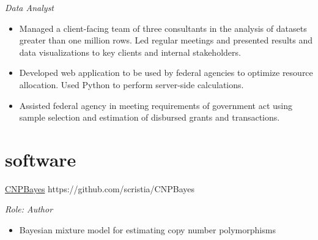\documentclass[]{friggeri-cv} %
\begin{document}
\begin{entrylist}
{\emph{Data Analyst}
\begin{itemize}
\renewcommand\labelitemi{--}
\item Managed a client-facing team of three consultants in the analysis of datasets greater than one million rows. 
Led regular meetings and presented results and data visualizations to key clients and internal stakeholders.
\item Developed web application to be used by federal agencies to optimize resource allocation. 
Used Python to perform server-side calculations.
\item Assisted federal agency in meeting requirements of government act using sample selection and estimation of disbursed grants and transactions.
\end{itemize}
}
\end{entrylist}


\section{software}
\begin{entrylist}
\entry
{}
{\href{https://github.com/scristia/CNPBayes}{CNPBayes}}
{https://github.com/scristia/CNPBayes}
{\emph{Role: Author}
\begin{itemize}
\renewcommand\labelitemi{--}
\item Bayesian mixture model for estimating copy number polymorphisms
\end{itemize}
}
\end{entrylist}
\end{document}
